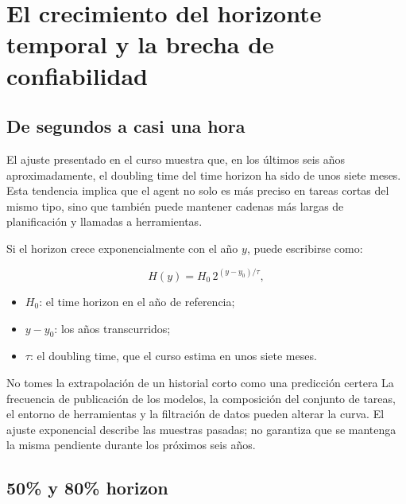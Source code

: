 \section{El crecimiento del horizonte temporal y la brecha de confiabilidad}

\subsection{De segundos a casi una hora}


El ajuste presentado en el curso muestra que, en los últimos seis años aproximadamente, el doubling time del time horizon ha sido de unos siete meses. Esta tendencia implica que el agent no solo es más preciso en tareas cortas del mismo tipo, sino que también puede mantener cadenas más largas de planificación y llamadas a herramientas.

Si el horizon crece exponencialmente con el año $y$, puede escribirse como:

$$
H(y)=H_0\,2^{(y-y_0)/\tau},
$$

\begin{itemize}
    \item $H_0$: el time horizon en el año de referencia;
    \item $y-y_0$: los años transcurridos;
    \item $\tau$: el doubling time, que el curso estima en unos siete meses.
\end{itemize}

\begin{warningbox}{No tomes la extrapolación de un historial corto como una predicción certera}
La frecuencia de publicación de los modelos, la composición del conjunto de tareas, el entorno de herramientas y la filtración de datos pueden alterar la curva. El ajuste exponencial describe las muestras pasadas; no garantiza que se mantenga la misma pendiente durante los próximos seis años.
\end{warningbox}

\subsection{50\% y 80\% horizon}


